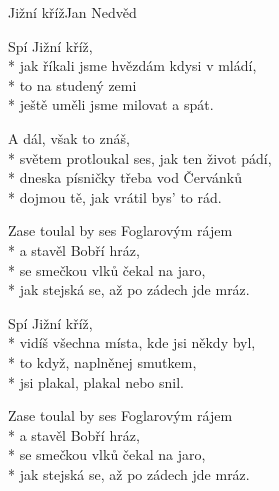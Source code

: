 \documentclass[10.5pt]{book}
\begin{document}
\fi
\begin{poem}{Jižní kříž}{Jan Nedvěd}

\settowidth{\versewidth}{světem protloukal ses, jak ten život pádí,}

Spí Jižní kříž,\\*
jak říkali jsme hvězdám kdysi v mládí,\\*
to na studený zemi\\*
ještě uměli jsme milovat a spát.

A dál, však to znáš,\\*
světem protloukal ses, jak ten život pádí,\\*
dneska písničky třeba vod Červánků\\*
dojmou tě, jak vrátil bys' to rád.

Zase toulal by ses Foglarovým rájem\\*
a stavěl Bobří hráz,\\*
se smečkou vlků čekal na jaro,\\*
jak stejská se, až po zádech jde mráz.

Spí Jižní kříž,\\*
vidíš všechna místa, kde jsi někdy byl,\\*
to když, naplněnej smutkem,\\*
jsi plakal, plakal nebo snil.

Zase toulal by ses Foglarovým rájem\\*
a stavěl Bobří hráz,\\*
se smečkou vlků čekal na jaro,\\*
jak stejská se, až po zádech jde mráz.
\end{poem}
\end{document}
